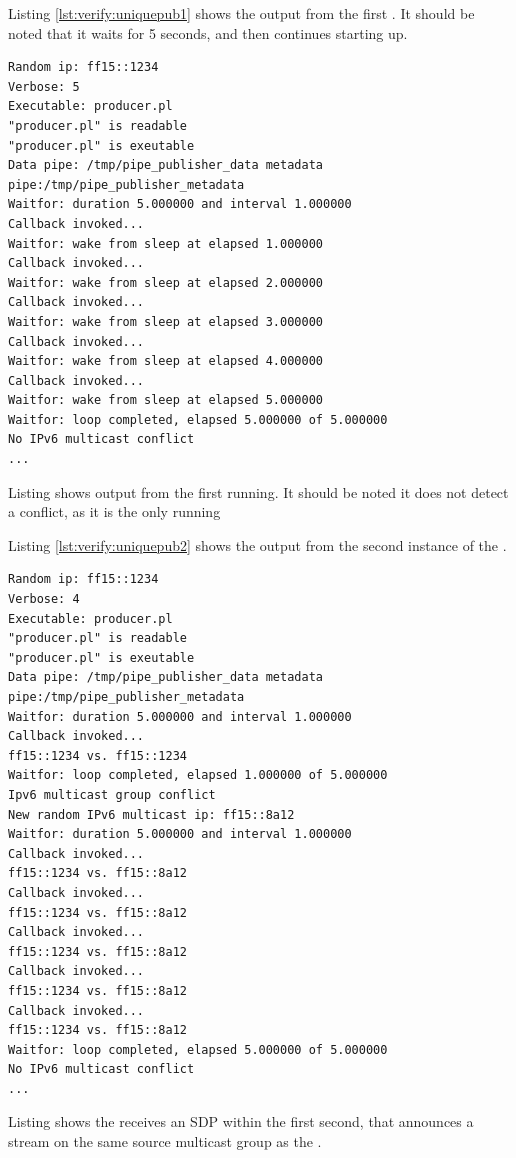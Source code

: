 Listing \ref{lst:verify:uniquepub1} shows the output from the first . It should be noted that it waits for 5 seconds, and then continues starting up.

\begin{listing}[H] 
\begin{verbatim}
Random ip: ff15::1234
Verbose: 5
Executable: producer.pl
"producer.pl" is readable
"producer.pl" is exeutable
Data pipe: /tmp/pipe_publisher_data metadata pipe:/tmp/pipe_publisher_metadata
Waitfor: duration 5.000000 and interval 1.000000
Callback invoked...
Waitfor: wake from sleep at elapsed 1.000000
Callback invoked...
Waitfor: wake from sleep at elapsed 2.000000
Callback invoked...
Waitfor: wake from sleep at elapsed 3.000000
Callback invoked...
Waitfor: wake from sleep at elapsed 4.000000
Callback invoked...
Waitfor: wake from sleep at elapsed 5.000000
Waitfor: loop completed, elapsed 5.000000 of 5.000000
No IPv6 multicast conflict
...
\end{verbatim}
\caption{Listing shows output from the first \pub{} running. It should be noted it does not detect a conflict, as it is the only \pub{} running}
\label{lst:verify:uniquepub1}
\end{listing}

Listing \ref{lst:verify:uniquepub2} shows the output from the second instance of the .

\begin{listing}[H] 
\begin{verbatim}
Random ip: ff15::1234
Verbose: 4
Executable: producer.pl
"producer.pl" is readable
"producer.pl" is exeutable
Data pipe: /tmp/pipe_publisher_data metadata pipe:/tmp/pipe_publisher_metadata
Waitfor: duration 5.000000 and interval 1.000000
Callback invoked...
ff15::1234 vs. ff15::1234
Waitfor: loop completed, elapsed 1.000000 of 5.000000
Ipv6 multicast group conflict
New random IPv6 multicast ip: ff15::8a12
Waitfor: duration 5.000000 and interval 1.000000
Callback invoked...
ff15::1234 vs. ff15::8a12
Callback invoked...
ff15::1234 vs. ff15::8a12
Callback invoked...
ff15::1234 vs. ff15::8a12
Callback invoked...
ff15::1234 vs. ff15::8a12
Callback invoked...
ff15::1234 vs. ff15::8a12
Waitfor: loop completed, elapsed 5.000000 of 5.000000
No IPv6 multicast conflict
...
\end{verbatim}
\caption{Listing shows the \pub{} receives an SDP within the first second, that announces a stream on the same source multicast group as the \pub{}. }
\label{lst:verify:uniquepub2}
\end{listing}

